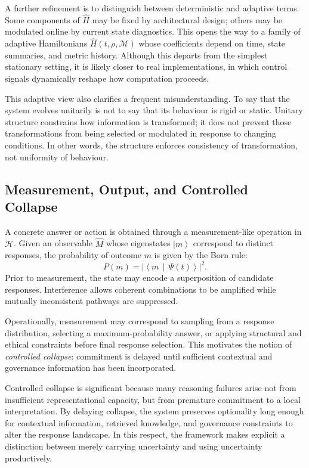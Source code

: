 \documentclass[12pt]{article}
\newcommand{\ket}[1]{\left|#1\right\rangle}
\newcommand{\braket}[2]{\left\langle#1\,\middle|\,#2\right\rangle}
\begin{document}
A further refinement is to distinguish between deterministic and adaptive terms. Some components of $\hat{H}$ may be fixed by architectural design; others may be modulated online by current state diagnostics. This opens the way to a family of adaptive Hamiltonians $\hat{H}(t,\rho,\mathcal{M})$ whose coefficients depend on time, state summaries, and metric history. Although this departs from the simplest stationary setting, it is likely closer to real implementations, in which control signals dynamically reshape how computation proceeds.

This adaptive view also clarifies a frequent misunderstanding. To say that the system evolves unitarily is not to say that its behaviour is rigid or static. Unitary structure constrains how information is transformed; it does not prevent those transformations from being selected or modulated in response to changing conditions. In other words, the structure enforces consistency of transformation, not uniformity of behaviour.

\subsection{Measurement, Output, and Controlled Collapse}
A concrete answer or action is obtained through a measurement-like operation in $\mathcal{H}$. Given an observable $\hat{M}$ whose eigenstates $\ket{m}$ correspond to distinct responses, the probability of outcome $m$ is given by the Born rule:
\begin{equation}
P(m) = \big|\braket{m}{\Psi(t)}\big|^2.
\end{equation}
Prior to measurement, the state may encode a superposition of candidate responses. Interference allows coherent combinations to be amplified while mutually inconsistent pathways are suppressed.

Operationally, measurement may correspond to sampling from a response distribution, selecting a maximum-probability answer, or applying structural and ethical constraints before final response selection. This motivates the notion of \emph{controlled collapse}: commitment is delayed until sufficient contextual and governance information has been incorporated.

Controlled collapse is significant because many reasoning failures arise not from insufficient representational capacity, but from premature commitment to a local interpretation. By delaying collapse, the system preserves optionality long enough for contextual information, retrieved knowledge, and governance constraints to alter the response landscape. In this respect, the framework makes explicit a distinction between merely carrying uncertainty and using uncertainty productively.
\end{document}
